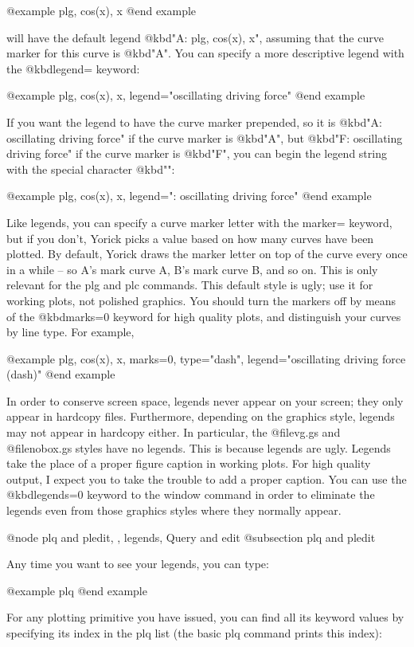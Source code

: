 @example
plg, cos(x), x
@end example

will have the default legend @kbd{"A: plg, cos(x), x"}, assuming that
the curve marker for this curve is @kbd{"A"}.  You can specify a more
descriptive legend with the @kbd{legend=} keyword:

@example
plg, cos(x), x, legend="oscillating driving force"
@end example

If you want the legend to have the curve marker prepended, so it is
@kbd{"A: oscillating driving force"} if the curve marker is @kbd{"A"},
but @kbd{"F: oscillating driving force"} if the curve marker is
@kbd{"F"}, you can begin the legend string with the special character
@kbd{"\1"}:

@example
plg, cos(x), x, legend="\1: oscillating driving force"
@end example

Like legends, you can specify a curve marker letter with the marker=
keyword, but if you don't, Yorick picks a value based on how many curves
have been plotted.  By default, Yorick draws the marker letter on top of
the curve every once in a while -- so A's mark curve A, B's mark curve
B, and so on.  This is only relevant for the plg and plc commands.  This
default style is ugly; use it for working plots, not polished graphics.
You should turn the markers off by means of the @kbd{marks=0} keyword
for high quality plots, and distinguish your curves by line type.  For
example,

@example
plg, cos(x), x, marks=0, type="dash",
  legend="oscillating driving force (dash)"
@end example

In order to conserve screen space, legends never appear on your screen;
they only appear in hardcopy files.  Furthermore, depending on the
graphics style, legends may not appear in hardcopy either.  In
particular, the @file{vg.gs} and @file{nobox.gs} styles have no legends.
This is because legends are ugly.  Legends take the place of a proper
figure caption in working plots.  For high quality output, I expect you
to take the trouble to add a proper caption.  You can use the
@kbd{legends=0} keyword to the window command in order to eliminate the
legends even from those graphics styles where they normally appear.

@node plq and pledit,  , legends, Query and edit
@subsection plq and pledit

Any time you want to see your legends, you can type:

@example
plq
@end example

For any plotting primitive you have issued, you can find all its
keyword values by specifying its index in the plq list (the basic plq
command prints this index):

